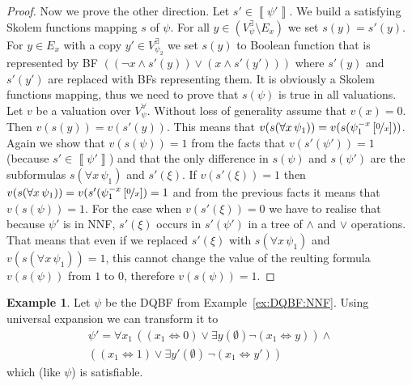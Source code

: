 \documentclass[
  digital, %
  twoside, %
  table,   %
  nolof,     %
  nolot,     %
]{fithesis3}
\newtheorem{lemma}[theorem]{Lemma}         %
\theoremstyle{definition}
\newtheorem{example}{Example}
\theoremstyle{remark}
\newcommand{\seman}[1]{\left\llbracket {#1} \right\rrbracket}
\newcommand{\substitute}[2]{\left[ \nicefrac{#2}{#1} \right]}
\newcommand{\DQBF}[1]{\mathbf{\Phi}_{#1}^{\normalfont{\text{\tiny DQBF}}}}
\newcommand{\evars}[1]{V_{#1}^{\exists}}
\newcommand{\uvars}[1]{V_{#1}^{\forall}}
\newcommand{\lequal}{\Leftrightarrow}
\newcommand{\itholds}{\,}
\begin{document}
\begin{proof}
  Now we prove the other direction. Let $s' \in \seman{\psi'}$. We build a satisfying Skolem functions mapping $s$ of $\psi$. For all $y \in (\evars{\psi} \setminus E_x)$ we set $s(y) = s'(y)$. For $y \in E_x$ with a copy $y' \in \evars{\psi_2}$ we set $s(y)$ to Boolean function that is represented by BF $((\neg x \land s'(y)) \lor (x \land s'(y')))$ where $s'(y)$ and $s'(y')$ are replaced with BFs representing them. It is obviously a Skolem functions mapping, thus we need to prove that $s(\psi)$ is true in all valuations. Let $v$ be a valuation over $\uvars{\psi}$. Without loss of generality assume that $v(x) = 0$. Then $v(s(y)) = v(s'(y))$. This means that $v(s(\forall x \itholds \psi_1)) = v(s(\psi_1^{-x}\substitute{x}{0}))$. Again we show that $v(s(\psi)) = 1$ from the facts that $v(s'(\psi')) = 1$ (because $s' \in \seman{\psi'}$) and that the only difference in $s(\psi)$ and $s(\psi')$ are the subformulas $s(\forall x\itholds\psi_1)$ and $s'(\xi)$. If $v(s'(\xi)) = 1$ then $v(s(\forall x \itholds \psi_1)) = v(s'(\psi_1^{-x}\substitute{x}{0}) = 1$ and from the previous facts it means that $v(s(\psi)) = 1$. For the case when $v(s'(\xi)) = 0$ we have to realise that because $\psi'$ is in NNF, $s'(\xi)$ occurs in $s'(\psi')$ in a tree of ${\land}$ and ${\lor}$ operations. That means that even if we replaced $s'(\xi)$ with $s(\forall x \itholds \psi_1)$ and $v(s(\forall x \itholds \psi_1)) = 1$, this cannot change the value of the reulting formula $v(s(\psi))$ from $1$ to $0$, therefore $v(s(\psi)) = 1$.
\end{proof}
\begin{example}
Let $\psi$ be the DQBF from Example~\ref{ex:DQBF:NNF}. Using universal expansion we can transform it to
\begin{multline*}
    \psi' = \forall x_1 \itholds ((x_1 \lequal 0) \lor \exists y (\emptyset) \neg(x_1 \lequal y)) \land {}\\
    ((x_1 \lequal 1) \lor \exists y' (\emptyset)\itholds\neg(x_1 \lequal y'))
\end{multline*}
which (like $\psi$) is satisfiable.
\end{example}

\end{document}
